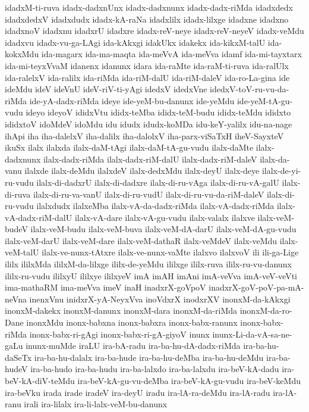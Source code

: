{idadxM-ti-ruva
idadx-dadxnUnx
idadx-dadxnunx
idadx-dadx-riMda
idadxdedx
idadxdedxV
idadxdudx
idadx-kA-raNa
idadxlilx
idadx-lilxge
idadxne
idadxno
idadxnoV
idadxnu
idadxrU
idadxre
idadx-reV-neye
idadx-reV-neyeV
idadx-veMdu
idadxvu
idadx-vu-ga-LAgi
ida-kAkxgi
idakUkx
idakekx
ida-kikxM-talU
ida-kokxMdu
ida-magarx
ida-ma-maqta
ida-meVvA
ida-meVva
idamf
ida-mi-tayxtarx
ida-mi-teyxVvaM
idanenx
idanunx
idara
ida-raMte
ida-raM-ti-ruva
ida-ralUlx
ida-ralelxV
ida-ralilx
ida-riMda
ida-riM-dalU
ida-riM-daleV
ida-ro-La-gina
ide
ideMdu
ideV
ideVnU
ideV-riV-ti-yAgi
idedxV
idedxVne
idedxV-toV-ru-vu-da-riMda
ide-yA-dadx-riMda
ideye
ide-yeM-bu-danunx
ide-yeMdu
ide-yeM-tA-gu-vudu
ideyo
ideyoV
ididxVtu
ididx-teMba
ididx-teM-budu
ididx-teMdu
ididxto
ididxtoV
idoMdeV
idoMdu
idu
idudx
idudx-koMDa
idu-keY-yalilx
idu-na-nage
ihApi
iha
iha-dalelxV
iha-dalilx
iha-dalolxV
iha-parx-viSaTxH
iheV-SayxteV
ikuSx
ilalx
ilalxda
ilalx-daM-tAgi
ilalx-daM-tA-gu-vudu
ilalx-daMte
ilalx-dadxnunx
ilalx-dadx-riMda
ilalx-dadx-riM-dalU
ilalx-dadx-riM-daleV
ilalx-da-vanu
ilalxde
ilalx-deMdu
ilalxdeV
ilalx-dedxMdu
ilalx-deyU
ilalx-deye
ilalx-de-yi-ru-vudu
ilalx-di-dadxrU
ilalx-di-dadxre
ilalx-di-ru-vAga
ilalx-di-ru-vA-galU
ilalx-di-ruva
ilalx-di-ru-va-vanU
ilalx-di-ru-vudU
ilalx-di-ru-vu-da-riM-daleV
ilalx-di-ru-vudu
ilalxdudx
ilalxeMba
ilalx-vA-da-dadx-riMda
ilalx-vA-dadx-riMda
ilalx-vA-dadx-riM-dalU
ilalx-vA-dare
ilalx-vA-gu-vudu
ilalx-valalx
ilalxve
ilalx-veM-budeV
ilalx-veM-budu
ilalx-veM-buva
ilalx-veM-dA-darU
ilalx-veM-dA-gu-vudu
ilalx-veM-darU
ilalx-veM-dare
ilalx-veM-dathaR
ilalx-veMdeV
ilalx-veMdu
ilalx-veM-talU
ilalx-ve-nunx-tAtxre
ilalx-ve-nunx-vaMte
ilalxvo
ilalxvoV
ili
ili-ga-Lige
ililx
ililxMda
ililxM-da-lilxge
ililx-de-yeMdu
ililxge
ililx-ruva
ililx-ru-vu-danunx
ililx-ru-vudu
ililxyU
ililxye
ililxyeV
imA
imAH
imAni
imA-veVva
imA-veV-veVti
ima-mathaRM
ima-meVva
imeV
inaH
inadxrX-goVpoV
inadxrX-goV-poV-pa-mA-neVna
inenxVnu
inidxrX-yA-NeyxVva
inoVdxrX
inodxrXV
inonxM-da-kAkxgi
inonxM-dakekx
inonxM-danunx
inonxM-dara
inonxM-da-riMda
inonxM-da-ro-Dane
inonxMdu
inonx-babxna
inonx-babxra
inonx-babx-ranunx
inonx-babx-riMda
inonx-babx-ri-gAgi
inonx-babx-ri-gA-giyoV
inunx
inunx-Li-da-vA-sa-ne-gaLu
inunx-muMde
iraLU
ira-bA-radu
ira-ba-hu-dA-dadx-riMda
ira-ba-hu-daSeTx
ira-ba-hu-dalalx
ira-ba-hude
ira-ba-hu-deMba
ira-ba-hu-deMdu
ira-ba-hudeV
ira-ba-hudo
ira-ba-hudu
ira-ba-lalxdo
ira-ba-lalxdu
ira-beV-kA-dadu
ira-beV-kA-diV-teMdu
ira-beV-kA-gu-vu-deMba
ira-beV-kA-gu-vudu
ira-beV-keMdu
ira-beVku
irada
irade
iradeV
ira-deyU
iradu
ira-lA-ra-deMdu
ira-lA-radu
ira-lA-ranu
irali
ira-lilalx
ira-li-lalx-veM-bu-danunx
}
